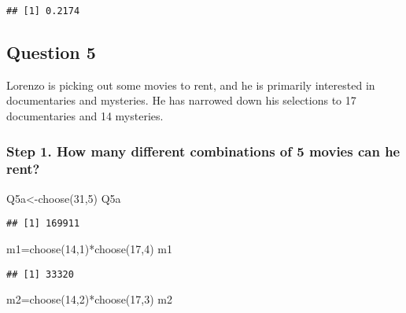 \documentclass[
]{article}
\newenvironment{Shaded}{\begin{snugshade}}{\end{snugshade}}
\newcommand{\DecValTok}[1]{\textcolor[rgb]{0.00,0.00,0.81}{#1}}
\newcommand{\FunctionTok}[1]{\textcolor[rgb]{0.00,0.00,0.00}{#1}}
\newcommand{\NormalTok}[1]{#1}
\newcommand{\OtherTok}[1]{\textcolor[rgb]{0.56,0.35,0.01}{#1}}
\newcommand{\SpecialCharTok}[1]{\textcolor[rgb]{0.00,0.00,0.00}{#1}}
\begin{document}
\begin{verbatim}
## [1] 0.2174
\end{verbatim}

\hypertarget{question-5}{%
\subsection{Question 5}\label{question-5}}

Lorenzo is picking out some movies to rent, and he is primarily
interested in documentaries and mysteries. He has narrowed down his
selections to 17 documentaries and 14 mysteries.

\hypertarget{step-1.-how-many-different-combinations-of-5-movies-can-he-rent}{%
\subsubsection{Step 1. How many different combinations of 5 movies can
he
rent?}\label{step-1.-how-many-different-combinations-of-5-movies-can-he-rent}}

\begin{Shaded}
\begin{Highlighting}[]
\NormalTok{Q5a}\OtherTok{\textless{}{-}}\FunctionTok{choose}\NormalTok{(}\DecValTok{31}\NormalTok{,}\DecValTok{5}\NormalTok{)}
\NormalTok{Q5a}
\end{Highlighting}
\end{Shaded}

\begin{verbatim}
## [1] 169911
\end{verbatim}

\begin{Shaded}
\begin{Highlighting}[]
\NormalTok{m1}\OtherTok{=}\FunctionTok{choose}\NormalTok{(}\DecValTok{14}\NormalTok{,}\DecValTok{1}\NormalTok{)}\SpecialCharTok{*}\FunctionTok{choose}\NormalTok{(}\DecValTok{17}\NormalTok{,}\DecValTok{4}\NormalTok{)}
\NormalTok{m1}
\end{Highlighting}
\end{Shaded}

\begin{verbatim}
## [1] 33320
\end{verbatim}

\begin{Shaded}
\begin{Highlighting}[]
\NormalTok{m2}\OtherTok{=}\FunctionTok{choose}\NormalTok{(}\DecValTok{14}\NormalTok{,}\DecValTok{2}\NormalTok{)}\SpecialCharTok{*}\FunctionTok{choose}\NormalTok{(}\DecValTok{17}\NormalTok{,}\DecValTok{3}\NormalTok{)}
\NormalTok{m2}
\end{Highlighting}
\end{Shaded}
\end{document}
